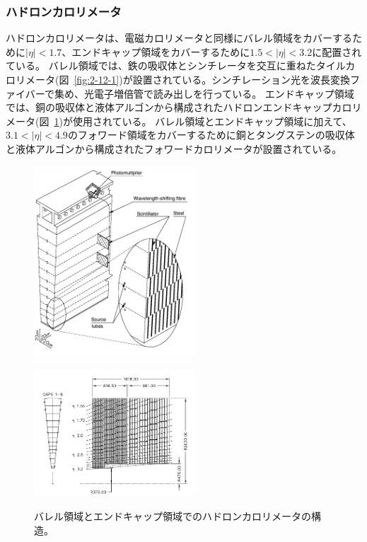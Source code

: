 \subsubsection{ハドロンカロリメータ}
ハドロンカロリメータは、電磁カロリメータと同様にバレル領域をカバーするために$|\eta|<1.7$、エンドキャップ領域をカバーするために$1.5<|\eta|<3.2$に配置されている。
バレル領域では、鉄の吸収体とシンチレータを交互に重ねたタイルカロリメータ(図~\ref{fig:2-12-1})が設置されている。シンチレーション光を波長変換ファイバーで集め、光電子増倍管で読み出しを行っている。
エンドキャップ領域では、銅の吸収体と液体アルゴンから構成されたハドロンエンドキャップカロリメータ(図~\ref{fig:2-12-2})が使用されている。
バレル領域とエンドキャップ領域に加えて、$3.1<|\eta|<4.9$のフォワード領域をカバーするために銅とタングステンの吸収体と液体アルゴンから構成されたフォワードカロリメータが設置されている。

\begin{figure}[h]
  \begin{minipage}[b]{0.45\linewidth}
      \centering
      \includegraphics[clip, width=6cm]{fig/2/TileCalo.png}
      \label{fig:2-12-1}
  \end{minipage}
    \begin{minipage}[b]{0.45\linewidth}
      \centering
      \includegraphics[clip, width=6cm]{fig/2/HadronEndcapCal.png}
      \label{fig:2-12-2}
  \end{minipage}
  \caption{バレル領域とエンドキャップ領域でのハドロンカロリメータの構造\cite{Aad:1129811}。}
\end{figure}


